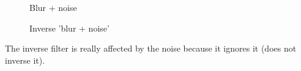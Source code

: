 \begin{figure}[!htb]\centering
    \begin{minipage}{0.45\textwidth}
        \caption{\small{Blur + noise}}
    \end{minipage}
    \begin{minipage}{0.45\textwidth}
    \caption{\small{Inverse 'blur + noise'}}\label{diagram:inv_blurred_noise}
    \end{minipage}
\end{figure}
\bigskip
The inverse filter is really affected by the noise because it ignores it (does not inverse it).

